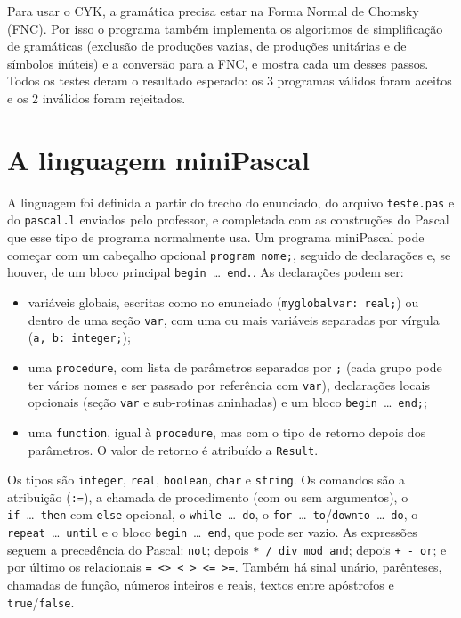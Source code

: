 \documentclass[12pt,a4paper]{article}
\newcommand{\code}[1]{\texttt{#1}}
\newcommand{\miniPascal}{miniPascal}
\begin{document}
Para usar o CYK, a gramática precisa estar na Forma Normal de Chomsky (FNC). Por isso o
programa também implementa os algoritmos de simplificação de gramáticas (exclusão de produções
vazias, de produções unitárias e de símbolos inúteis) e a conversão para a FNC, e mostra cada
um desses passos. Todos os testes deram o resultado esperado: os 3 programas válidos foram
aceitos e os 2 inválidos foram rejeitados.

\section{A linguagem miniPascal}

A linguagem foi definida a partir do trecho do enunciado, do arquivo \code{teste.pas} e do
\code{pascal.l} enviados pelo professor, e completada com as construções do Pascal que esse tipo
de programa normalmente usa. Um programa \miniPascal{} pode começar com um cabeçalho opcional
\code{program nome;}, seguido de declarações e, se houver, de um bloco principal
\code{begin}~\dots~\code{end.}. As declarações podem ser:

\begin{itemize}[nosep]
  \item variáveis globais, escritas como no enunciado (\code{myglobalvar: real;}) ou dentro de
        uma seção \code{var}, com uma ou mais variáveis separadas por vírgula (\code{a, b: integer;});
  \item uma \code{procedure}, com lista de parâmetros separados por \code{;} (cada grupo pode ter
        vários nomes e ser passado por referência com \code{var}), declarações locais opcionais
        (seção \code{var} e sub-rotinas aninhadas) e um bloco \code{begin}~\dots~\code{end;};
  \item uma \code{function}, igual à \code{procedure}, mas com o tipo de retorno depois dos
        parâmetros. O valor de retorno é atribuído a \code{Result}.
\end{itemize}

Os tipos são \code{integer}, \code{real}, \code{boolean}, \code{char} e \code{string}. Os
comandos são a atribuição (\code{:=}), a chamada de procedimento (com ou sem argumentos), o
\code{if}~\dots~\code{then} com \code{else} opcional, o \code{while}~\dots~\code{do}, o
\code{for}~\dots~\code{to}/\code{downto}~\dots~\code{do}, o \code{repeat}~\dots~\code{until} e o
bloco \code{begin}~\dots~\code{end}, que pode ser vazio. As expressões seguem a precedência do
Pascal: \code{not}; depois \code{* / div mod and}; depois \code{+ - or}; e por último os
relacionais \code{= <> < > <= >=}. Também há sinal unário, parênteses, chamadas de função,
números inteiros e reais, textos entre apóstrofos e \code{true}/\code{false}.
\end{document}
